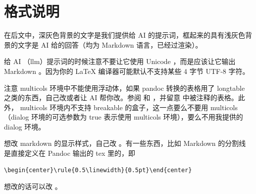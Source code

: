 \documentclass{MMCStyle}
\begin{document}
\begin{abstract}
本文是参赛队（编号 MC1111111）的 AI 工具使用详情说明。文档将列出论文撰写过程中的 AI 工具的使用详情。
\end{abstract}


\tableofcontents\newpage
\clearpage
{}
\pagestyle{fancy}

\section{格式说明}

在后文中，深灰色背景的文字是我们提供给 AI 的提示词，框起来的具有浅灰色背景的文字是 AI 给的回答（均为 Markdown 语言，已经过渲染）。

给 AI （llm）提示词的时候注意不要让它使用 Unicode ，而是应该让它输出 Markdown 。因为你的 \LaTeX{} 编译器可能默认不支持某些 4 字节 UTF-8 字符。

注意 multicols 环境中不能使用浮动体，如果 pandoc 转换的表格用了 longtable 之类的东西，自己改或者让 AI 帮你改。参阅  和  ，并留意  中被注释的表格。此外， multicols 环境内不支持 breakable 的盒子，这一点要么不要用 multicols （dialog 环境的可选参数为 true 表示使用 multicols 环境），要么不用我提供的 dialog 环境。

想改 markdown 的显示样式，自己改  。有一些东西，比如 Markdown 的分割线 \inline{---} 是直接定义在 Pandoc 输出的 tex 里的，即
\begin{verbatim}
\begin{center}\rule{0.5\linewidth}{0.5pt}\end{center}
\end{verbatim}
想改的话可以改  。

\end{document}

